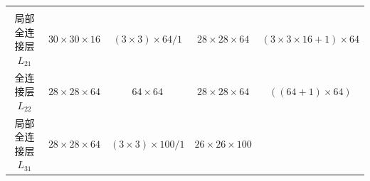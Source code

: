 \documentclass[12pt,a4paper,UTF8,twoside]{book}
\begin{document}
\begin{longtable}[]{@{}ccccc@{}}
\begin{minipage}[t]{0.18\columnwidth}
\end{minipage}\tabularnewline
\begin{minipage}[t]{0.16\columnwidth}\centering
局部全连接层\(L_{21}\)\strut
\end{minipage} & \begin{minipage}[t]{0.18\columnwidth}\centering
\(30\times30\times16\)\strut
\end{minipage} & \begin{minipage}[t]{0.16\columnwidth}\centering
\((3\times3)\times64/1\)\strut
\end{minipage} & \begin{minipage}[t]{0.20\columnwidth}\centering
\(28\times28\times64\)\strut
\end{minipage} & \begin{minipage}[t]{0.18\columnwidth}\centering
\((3\times3\times16+1)\times64\)\strut
\end{minipage}\tabularnewline
\begin{minipage}[t]{0.16\columnwidth}\centering
全连接层\(L_{22}\)\strut
\end{minipage} & \begin{minipage}[t]{0.18\columnwidth}\centering
\(28\times28\times64\)\strut
\end{minipage} & \begin{minipage}[t]{0.16\columnwidth}\centering
\(64\times64\)\strut
\end{minipage} & \begin{minipage}[t]{0.20\columnwidth}\centering
\(28\times28\times64\)\strut
\end{minipage} & \begin{minipage}[t]{0.18\columnwidth}\centering
\(((64+1)\times64)\)\strut
\end{minipage}\tabularnewline
\begin{minipage}[t]{0.16\columnwidth}\centering
局部全连接层\(L_{31}\)\strut
\end{minipage} & \begin{minipage}[t]{0.18\columnwidth}\centering
\(28\times28\times64\)\strut
\end{minipage} & \begin{minipage}[t]{0.16\columnwidth}\centering
\((3\times3)\times100/1\)\strut
\end{minipage} & \begin{minipage}[t]{0.20\columnwidth}\centering
\(26\times26\times100\)\strut
\end{minipage} & \begin{minipage}[t]{0.18\columnwidth}\centering

\end{minipage}
\end{longtable}
\end{document}
